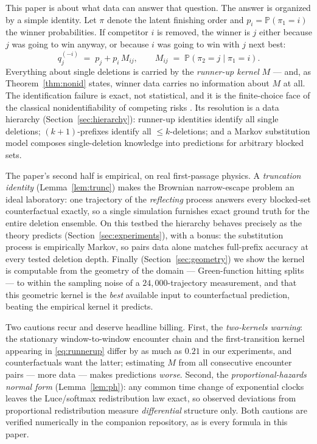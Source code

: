 \documentclass[11pt]{article}
\theoremstyle{remark}
\newcommand{\Prob}{\mathbb{P}}
\begin{document}
This paper is about what data can answer that question. The answer is organized by a
simple identity. Let $\pi$ denote the latent finishing order and
$p_i = \Prob(\pi_1 = i)$ the winner probabilities. If competitor $i$ is removed, the
winner is $j$ either because $j$ was going to win anyway, or because $i$ was going to
win with $j$ next best:
\begin{equation}
q_j^{(-i)} \;=\; p_j + p_i\, M_{ij},
\qquad
M_{ij} \;=\; \Prob(\pi_2 = j \mid \pi_1 = i).
\label{eq:runnerup}
\end{equation}
Everything about single deletions is carried by the \emph{runner-up kernel} $M$ ---
and, as Theorem~\ref{thm:nonid} states, winner data carries no information about $M$
at all. The identification failure is exact, not statistical, and it is the
finite-choice face of the classical nonidentifiability of competing risks
\cite{tsiatis1975,cox1959}. Its resolution is a data hierarchy
(Section~\ref{sec:hierarchy}): runner-up identities identify all single deletions;
$(k{+}1)$-prefixes identify all $\le k$-deletions; and a Markov substitution model
composes single-deletion knowledge into predictions for arbitrary blocked sets.

The paper's second half is empirical, on real first-passage physics. A
\emph{truncation identity} (Lemma~\ref{lem:trunc}) makes the Brownian narrow-escape
problem an ideal laboratory: one trajectory of the \emph{reflecting} process answers
every blocked-set counterfactual exactly, so a single simulation furnishes exact
ground truth for the entire deletion ensemble. On this testbed the hierarchy behaves
precisely as the theory predicts (Section~\ref{sec:experiments}), with a bonus: the
substitution process is empirically Markov, so pairs data alone matches full-prefix
accuracy at every tested deletion depth. Finally (Section~\ref{sec:geometry}) we
show the kernel is computable from the geometry of the domain --- Green-function
hitting splits --- to within the sampling noise of a $24{,}000$-trajectory
measurement, and that this geometric kernel is the \emph{best} available input to
counterfactual prediction, beating the empirical kernel it predicts.

Two cautions recur and deserve headline billing. First, the \emph{two-kernels
warning}: the stationary window-to-window encounter chain and the first-transition
kernel appearing in \eqref{eq:runnerup} differ by as much as $0.21$ in our
experiments, and counterfactuals want the latter; estimating $M$ from all
consecutive encounter pairs --- more data --- makes predictions \emph{worse}.
Second, the \emph{proportional-hazards normal form} (Lemma~\ref{lem:ph}): any common
time change of exponential clocks leaves the Luce/softmax redistribution law exact,
so observed deviations from proportional redistribution measure \emph{differential}
structure only. Both cautions are verified numerically in the companion repository,
as is every formula in this paper.
\end{document}
